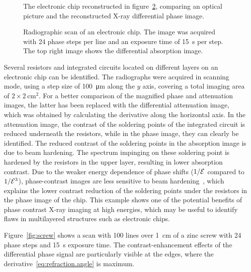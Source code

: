 \begin{figure}[htb]
\begin{subfigure}[b]{.49\textwidth}
    \caption{}
    \end{subfigure}
    \caption{The electronic chip reconstructed in figure~\ref{fig:img_chip},
comparing an optical picture and the reconstructed X-ray differential phase
image.}
    \label{fig:chip_photo}
\end{figure}

\begin{figure}[htp]
    \centering
    
    \caption{Radiographic scan of an electronic chip. The image was acquired
        with 24 phase steps per line and an exposure time of \SI{15}{\second} per
    step. The top right image shows the differential absorption image.}\label{fig:img_chip}
\end{figure}

Several resistors and integrated circuits located on different
layers on an electronic chip can be identified. The radiographs were acquired in scanning
mode, using a step size of \SI{100}{\micro\metre} along the $y$ axis, covering a total imaging
area of $2 \times \SI{2}{\centi\metre^2}$. For a better comparison of the magnified phase and
attenuation images, the latter has been replaced with the differential
attenuation image, which was obtained by calculating the derivative along
the horizontal axis. In the attenuation image, the contrast of the soldering
points of the integrated circuit is reduced underneath the resistors, while
in the phase image, they can clearly be identified. The reduced contrast of
the soldering points in the absorption image is due to beam hardening. The
spectrum impinging on these soldering point is hardened by the resistors in
the upper layer, resulting in lower absorption contrast. Due to the weaker
energy dependence of phase shifts ($1/\mathcal{E}$ compared to $1/\mathcal{E}^3$), phase-contrast
images are less sensitive to beam hardening~\cite{Chabior2011a}, which explains the lower
contrast reduction of the soldering points under the resistors in the
phase image of the chip. This example shows one of the potential benefits of
phase contrast X-ray imaging at high energies, which may be useful to
identify flaws in multilayered structures such as electronic chips.

Figure~\ref{fig:screw} shows a scan with \num{100} lines over
\SI{1}{\centi\metre} of a zinc screw
with \num{24} phase steps and \SI{15}{\second} exposure time.
The contrast-enhancement effects of the differential phase signal are
particularly visible at the edges, where the
derivative~\eqref{eq:refraction.angle} is maximum.

